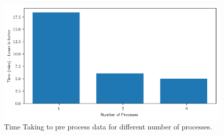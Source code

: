 \begin{figure}[b]
    \centering
    \includegraphics[width=\columnwidth]{tex/figures/multiprocess/multi_process_time.png}
    \caption{Time Taking to pre process data for different number of processes.}
    \label{fig:multip:time}
\end{figure}
